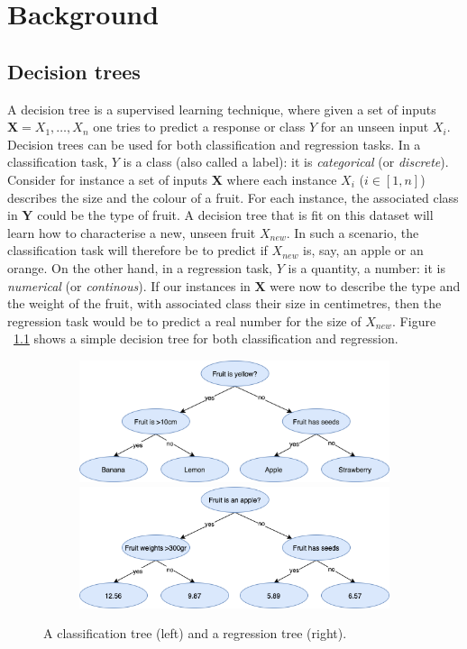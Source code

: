 \chapter{Background}

\section{Decision trees}\label{section:decision_trees}

A decision tree is a supervised learning technique, where given a set of inputs $\textbf{X} = X_1,\dots,X_n$ one tries to predict a response or class $Y$ for an unseen input $X_i$. Decision trees can be used for both classification and regression tasks. In a classification task, $Y$ is a class (also called a label): it is \textit{categorical} (or \textit{discrete}). Consider for instance a set of inputs \textbf{X} where each instance $X_i$ ($i \in [1,n]$) describes the size and the colour of a fruit. For each instance, the associated class in $\textbf{Y}$ could be the type of fruit. A decision tree that is fit on this dataset will learn how to characterise a new, unseen fruit $X_{new}$. In such a scenario, the classification task will therefore be to predict if $X_{new}$ is, say, an apple or an orange. On the other hand, in a regression task, $Y$ is a quantity, a number: it is \textit{numerical} (or \textit{continous}). If our instances in $\textbf{X}$ were now to describe the type and the weight of the fruit, with associated class their size in centimetres, then the regression task would be to predict a real number for the size of $X_{new}$. Figure ~\ref{fig:decision_tree} shows a simple decision tree for both classification and regression.

\begin{figure}[h!]
	\center
  \begin{subfigure}{\linewidth}
  \includegraphics[width=.48\linewidth]{images/background/decision_tree_classification.png}\hfill
  \includegraphics[width=.48\linewidth]{images/background/decision_tree_regression.png}
  \end{subfigure}
  \caption{\label{fig:decision_tree}A classification tree (left) and a regression tree (right).}
\end{figure}


